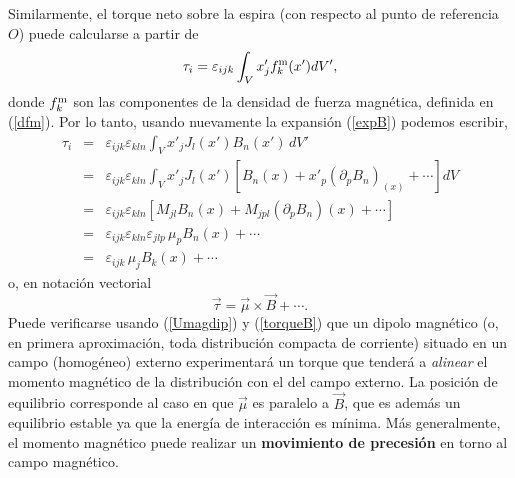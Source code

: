 Similarmente, el torque neto sobre la espira (con respecto al punto de referencia $O$)  puede calcularse a partir de
\begin{equation}
 \tau_i=\varepsilon_{ijk}\int_V x'_j f^{\rm m}_k(x') dV',
\end{equation}
donde $f^{\rm m}_k$ son las componentes de la densidad de fuerza magnética,
definida en (\ref{dfm}). Por lo tanto, usando nuevamente la expansión
(\ref{expB}) podemos escribir,
\begin{eqnarray}
  \tau_i&=&\varepsilon_{ijk}\varepsilon_{kln}\int_V x'_j J_l(x')B_n(x')\, dV' \\
&=&\varepsilon_{ijk}\varepsilon_{kln}\int_V x'_j
J_l(x')\left[B_n(x)+x'_p(\partial_pB_n)_(x) +\cdots\right] dV \\
&=&\varepsilon_{ijk}\varepsilon_{kln}\left[M_{jl}B_n(x)+M_{jpl}(\partial_pB_n)(x)
+\cdots\right] \\
&=&\varepsilon_{ijk}\varepsilon_{kln}\varepsilon_{jlp}\,\mu_pB_n(x)+\cdots\\
&=&\varepsilon_{ijk}\,\mu_jB_k(x)+\cdots 
\end{eqnarray}
o, en notación vectorial
\begin{equation}
 \boxed{\vec{\tau}=\vec{\mu}\times\vec{B}+\cdots .} \label{torqueB}
\end{equation}
Puede verificarse usando (\ref{Umagdip}) y (\ref{torqueB}) que un dipolo
magnético (o, en primera aproximación, toda distribución compacta de
corriente) situado en un campo (homogéneo) externo experimentará un torque
que tenderá a \textit{alinear} el momento magnético de la distribución con el
del campo externo. La posición de equilibrio corresponde al caso en que
$\vec{\mu}$ es paralelo a $\vec{B}$, que es además un equilibrio estable ya
que la energía de interacción es mínima. Más generalmente, el momento
magnético puede realizar un \textbf{movimiento de precesión} en torno al campo
magnético.


